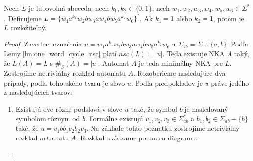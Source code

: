 \begin{theorem}
Nech $ \Sigma $ je ľubovolná abeceda, nech $ k_1,k_2 \in \lbrace 0,1 \rbrace $, nech $ w_1,w_2,w_3,w_4,w_5,w_6 \in \Sigma^* $. Definujeme $ L = \lbrace w_1a^{k_1}w_2bw_3aw_4bw_5a^{k_2}w_6 \rbrace^* $. Ak $ k_1 = 1 $ alebo $ k_2 = 1 $, potom je $ L $ rozložiteľný.
\end{theorem}

\begin{proof}
Zaveďme označenia $ u = w_1a^{k_1}w_2bw_3aw_4bw_5a^{k_2}w_6$ a $ \Sigma_{ab} = \Sigma \cup \lbrace a,b \rbrace $. Podľa Lemy \ref{lm:one_word_cycle_nsc} platí $ nsc(L) = |u| $. Teda existuje NKA $ A $ taký, že $ L(A) = L $ s $ \#_S(A) = |u| $. Automat $ A $ je teda minimálny NKA pre $ L $. Zostrojíme netriviálny rozklad automatu $ A $. Rozoberieme nasledujúce dva prípady, podľa toho akého tvaru je slovo $ u $. Podľa predpokladov je $ u $ práve jedého z nasledujúcich tvarov:

\begin{enumerate}
\item Existujú dve rôzne podslová v slove $ u $ také, že symbol $ b $ je nasledovaný symbolom rôznym od $ b $. Formálne existujú $ v_1,v_2,v_3 \in \Sigma_{ab}^* $ a $ \overline{b}_1,\overline{b}_2 \in \Sigma_{ab} - \lbrace b \rbrace $ také, že $ u = v_1b\overline{b}_1v_2\overline{b}_2v_3 $. Na základe tohto poznatku zostrojíme netriviálny rozklad automatu $ A $. Rozklad uvádzame pomocou diagramu.

\begin{figure}[H]
\centering
{}


\end{figure}
\end{enumerate}
\end{proof}
